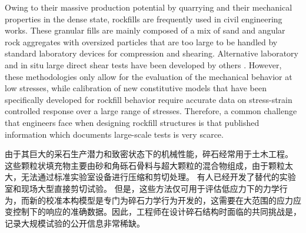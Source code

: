\begin{ParaColumn}

    Owing to their massive production potential by quarrying and their mechanical properties in the dense state, rockfills are frequently used in civil engineering works. These granular fills are mainly composed of a mix of sand and angular rock aggregates with oversized particles that are too large to be handled by standard laboratory devices for compression and shearing. Alternative laboratory and in situ large direct shear tests have been developed by others \citep{Barton1981873,Matsuoka200192,Estaire200673}. However, these methodologies only allow for the evaluation of the mechanical behavior at low stresses, while calibration of new constitutive models that have been specifically developed for rockfill behavior \citep{Chávez2003215,Varadarajan2003206,Xiao20171,Yin2017} require accurate data on stress-strain controlled response over a large range of stresses. Therefore, a common challenge that engineers face when designing rockfill structures is that published information which documents large-scale tests is very scarce.

    \switchcolumn

    由于其巨大的采石生产潜力和致密状态下的机械性能，碎石经常用于土木工程。 这些颗粒状填充物主要由砂和角砾石骨料与超大颗粒的混合物组成，由于颗粒太大，无法通过标准实验室设备进行压缩和剪切处理。 有人已经开发了替代的实验室和现场大型直接剪切试验\citep{Barton1981873,Matsuoka200192,Estaire200673}。 但是，这些方法仅可用于评估低应力下的力学行为，而新的校准本构模型\citep{Chávez2003215,Varadarajan2003206,Xiao20171,Yin2017}是专门为碎石力学行为开发的，这需要在大范围的应力应变控制下的响应的准确数据。因此，工程师在设计碎石结构时面临的共同挑战是，记录大规模试验的公开信息非常稀缺。

    \switchcolumn*


\end{ParaColumn}
